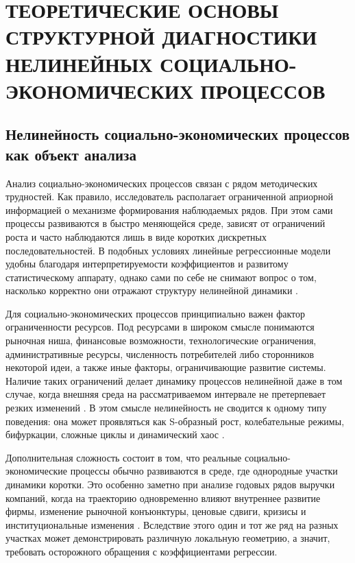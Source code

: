 \chapter{ТЕОРЕТИЧЕСКИЕ ОСНОВЫ СТРУКТУРНОЙ ДИАГНОСТИКИ НЕЛИНЕЙНЫХ СОЦИАЛЬНО-ЭКОНОМИЧЕСКИХ ПРОЦЕССОВ}
\label{chap:theoretical-foundations}

\section{Нелинейность социально-экономических процессов как объект анализа}
\label{sec:nonlinearity-as-object}

Анализ социально-экономических процессов связан с рядом методических трудностей. Как правило, исследователь располагает ограниченной априорной информацией о механизме формирования наблюдаемых рядов. При этом сами процессы развиваются в быстро меняющейся среде, зависят от ограничений роста и часто наблюдаются лишь в виде коротких дискретных последовательностей. В подобных условиях линейные регрессионные модели удобны благодаря интерпретируемости коэффициентов и развитому статистическому аппарату, однако сами по себе не снимают вопрос о том, насколько корректно они отражают структуру нелинейной динамики \cite{malinetsky,strogatz,montgomery,wooldridge}.

Для социально-экономических процессов принципиально важен фактор ограниченности ресурсов. Под ресурсами в широком смысле понимаются рыночная ниша, финансовые возможности, технологические ограничения, административные ресурсы, численность потребителей либо сторонников некоторой идеи, а также иные факторы, ограничивающие развитие системы. Наличие таких ограничений делает динамику процессов нелинейной даже в том случае, когда внешняя среда на рассматриваемом интервале не претерпевает резких изменений \cite{pu,polunin-2019,polunin-yudanov-2020}. В этом смысле нелинейность не сводится к одному типу поведения: она может проявляться как S-образный рост, колебательные режимы, бифуркации, сложные циклы и динамический хаос \cite{malinetsky,kuznetsov-maps,feigenbaum-ufn,nicolis-prigogine}.

Дополнительная сложность состоит в том, что реальные социально-экономические процессы обычно развиваются в среде, где однородные участки динамики коротки. Это особенно заметно при анализе годовых рядов выручки компаний, когда на траекторию одновременно влияют внутреннее развитие фирмы, изменение рыночной конъюнктуры, ценовые сдвиги, кризисы и институциональные изменения \cite{coad,medovnikov,baranova-yudanov}. Вследствие этого один и тот же ряд на разных участках может демонстрировать различную локальную геометрию, а значит, требовать осторожного обращения с коэффициентами регрессии.

